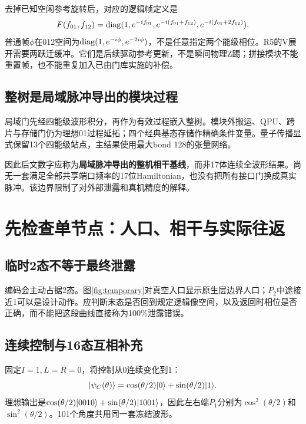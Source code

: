 去掉已知空闲参考旋转后，对应的逻辑帧定义是
\begin{equation}\label{eq:frame}
 F(f_{01},f_{12})=\operatorname{diag}(1,e^{-if_{01}},e^{-i(f_{01}+f_{12})},e^{-i(f_{01}+2f_{12})}).
\end{equation}
普通帧$\phi$在012空间为$\operatorname{diag}(1,e^{-i\phi},e^{-2i\phi})$，不是任意指定两个能级相位。R5的V展开需要两跃迁缓冲。它们是后续驱动参考更新，不是瞬间物理Z踢；拼接模块不能重置帧，也不能重复加入已由门库实施的补偿。

\subsection{整树是局域脉冲导出的模块过程}
局域门先经四能级波形积分，再作为有效过程嵌入整树。模块外搬运、QPU、跨片与存储门仍为理想01过程延拓；四个经典基态存储作精确条件变量。量子传播显式保留13个四能级站点，主结果使用最大bond 128的张量网络。

因此后文数字应称为\textbf{局域脉冲导出的整机相干基线}，而非17体连续全波形结果。尚无一套满足全部共享端口频率的17位Hamiltonian，也没有把所有接口门换成真实脉冲。该边界限制了对外部泄露和真机精度的解释。
\FloatBarrier

\section{先检查单节点：人口、相干与实际往返}\label{sec:local}
\subsection{临时2态不等于最终泄露}
编码会主动占据2态。图\ref{fig:temporary}对真空入口显示原生层边界人口；$P_2$中途接近1可以是设计动作。应判断末态是否回到规定逻辑像空间，以及返回时相位是否正确，而不能把这段曲线直接称为100\%泄露错误。

\subsection{连续控制与16态互相补充}
固定$I=1,L=R=0$，将控制从0连续变化到1：
\begin{equation}
 \lvert \psi_C(\theta)\rangle=\cos(\theta/2)\lvert 0\rangle+\sin(\theta/2)\lvert 1\rangle.
\end{equation}
理想输出是$\cos(\theta/2)\lvert 0010\rangle+\sin(\theta/2)\lvert 1001\rangle$，因此左右端$P_1$分别为$\cos^2(\theta/2)$和$\sin^2(\theta/2)$。101个角度共用同一套冻结波形。

